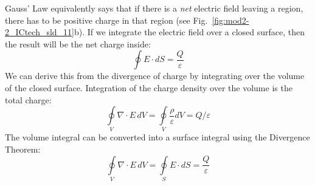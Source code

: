 Gauss’ Law equivalently says that if there is a \textit{net} electric field leaving a region, there has to be positive charge in that region (see Fig.~\ref{fig:mod2-2_ICtech_sld_11}b).   If we integrate the electric field over a closed surface, then the result will be the net charge inside:
\begin{equation}
	\oint {E \cdot dS = \frac{Q}{\varepsilon }} 
\end{equation}
We can derive this from the divergence of charge by integrating over the volume of the closed surface.  Integration of the charge density over the volume is the total charge:
\begin{equation}
	\oint\limits_V {\nabla \cdot E\,dV =} \oint\limits_V {\frac{\rho}{\varepsilon}dV = Q/\varepsilon} 
\end{equation}
The volume integral can be converted into a surface integral using the Divergence Theorem:
\begin{equation} 
	\oint\limits_V {\nabla  \cdot E\,dV = } \oint\limits_S {E \cdot dS = } \frac{Q}{\varepsilon } 
\end{equation}
